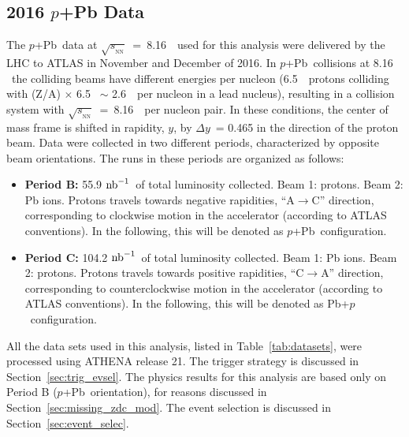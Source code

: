 \documentclass[NOTE, atlasdraft=true, texlive=2020, UKenglish]{atlasdoc}
\newcommand{\RAP}{$y$}
\newcommand{\SNN}{\ensuremath{\sqrt{s_{_\text{NN}}}}}
\newcommand{\pxPb}{$p$+Pb}
\newcommand{\Pbxp}{Pb+$p$}
\newcommand{\NB}{$\textnormal{nb}^{-1}$}
\begin{document}
\subsection{2016 \texorpdfstring{\pxPb}{p+Pb} Data}
The \pxPb\ data at \SNN~=~8.16~\TeV\ used for this analysis were delivered by the LHC to ATLAS in November and December of 2016. In \pxPb\ collisions at 8.16 \TeV\ the colliding beams have different energies per nucleon (6.5~\TeV\ protons colliding with (Z/A) $\times$ 6.5 \TeV\ $\sim$ 2.6~\TeV\ per nucleon in a lead nucleus), resulting in a collision system with \SNN~=~8.16~\TeV\ per nucleon pair. In these conditions, the center of
mass frame is shifted in rapidity, \RAP, by $\Delta$\RAP\ = 0.465 in the direction of the proton beam. Data were collected in two different periods, characterized by opposite beam orientations. The runs in these periods are organized  as follows:
\begin{itemize}
\item \textbf{Period B:} 55.9 \NB\ of total luminosity collected. Beam 1: protons. Beam 2: Pb ions. Protons travels towards negative rapidities, ``A$\rightarrow$C'' direction, corresponding to clockwise motion in the accelerator (according to ATLAS conventions). In the following, this will be denoted as \pxPb\ configuration. 
\item \textbf{Period C:} 104.2 \NB\ of total luminosity collected. Beam 1: Pb ions. Beam 2: protons. Protons travels towards positive rapidities, ``C$\rightarrow$A'' direction, corresponding to counterclockwise motion in the accelerator (according to ATLAS conventions). In the following, this will be denoted as \Pbxp\ configuration. 
\end{itemize}
All the data sets used in this analysis, listed in Table~\ref{tab:datasets}, were processed using ATHENA release 21. The trigger strategy is discussed in Section~\ref{sec:trig_evsel}.
The physics results for this analysis are based only on Period B (\pxPb\ orientation), for reasons discussed in Section~\ref{sec:missing_zdc_mod}. The event selection is discussed in Section~\ref{sec:event_selec}.
\end{document}
